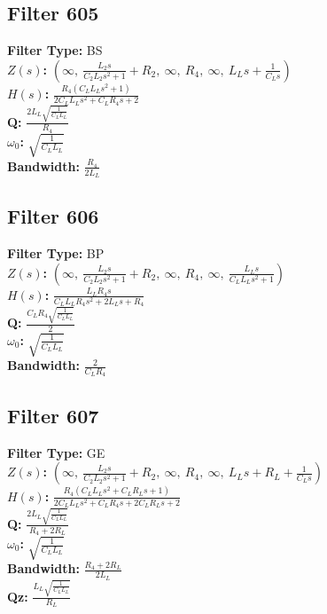 \documentclass{article}
\begin{document}
\subsection*{Filter 605}
\textbf{Filter Type:} BS \\ 
\textbf{$Z(s)$:} $\left( \infty, \  \frac{L_{2} s}{C_{2} L_{2} s^{2} + 1} + R_{2}, \  \infty, \  R_{4}, \  \infty, \  L_{L} s + \frac{1}{C_{L} s}\right)$ \\ 
\textbf{$H(s)$:} $\frac{R_{4} \left(C_{L} L_{L} s^{2} + 1\right)}{2 C_{L} L_{L} s^{2} + C_{L} R_{4} s + 2}$ \\ 
\textbf{Q:} $\frac{2 L_{L} \sqrt{\frac{1}{C_{L} L_{L}}}}{R_{4}}$ \\ 
\textbf{$\omega_0$:} $\sqrt{\frac{1}{C_{L} L_{L}}}$ \\ 
\textbf{Bandwidth:} $\frac{R_{4}}{2 L_{L}}$ \\ 
\subsection*{Filter 606}
\textbf{Filter Type:} BP \\ 
\textbf{$Z(s)$:} $\left( \infty, \  \frac{L_{2} s}{C_{2} L_{2} s^{2} + 1} + R_{2}, \  \infty, \  R_{4}, \  \infty, \  \frac{L_{L} s}{C_{L} L_{L} s^{2} + 1}\right)$ \\ 
\textbf{$H(s)$:} $\frac{L_{L} R_{4} s}{C_{L} L_{L} R_{4} s^{2} + 2 L_{L} s + R_{4}}$ \\ 
\textbf{Q:} $\frac{C_{L} R_{4} \sqrt{\frac{1}{C_{L} L_{L}}}}{2}$ \\ 
\textbf{$\omega_0$:} $\sqrt{\frac{1}{C_{L} L_{L}}}$ \\ 
\textbf{Bandwidth:} $\frac{2}{C_{L} R_{4}}$ \\ 
\subsection*{Filter 607}
\textbf{Filter Type:} GE \\ 
\textbf{$Z(s)$:} $\left( \infty, \  \frac{L_{2} s}{C_{2} L_{2} s^{2} + 1} + R_{2}, \  \infty, \  R_{4}, \  \infty, \  L_{L} s + R_{L} + \frac{1}{C_{L} s}\right)$ \\ 
\textbf{$H(s)$:} $\frac{R_{4} \left(C_{L} L_{L} s^{2} + C_{L} R_{L} s + 1\right)}{2 C_{L} L_{L} s^{2} + C_{L} R_{4} s + 2 C_{L} R_{L} s + 2}$ \\ 
\textbf{Q:} $\frac{2 L_{L} \sqrt{\frac{1}{C_{L} L_{L}}}}{R_{4} + 2 R_{L}}$ \\ 
\textbf{$\omega_0$:} $\sqrt{\frac{1}{C_{L} L_{L}}}$ \\ 
\textbf{Bandwidth:} $\frac{R_{4} + 2 R_{L}}{2 L_{L}}$ \\ 
\textbf{Qz:} $\frac{L_{L} \sqrt{\frac{1}{C_{L} L_{L}}}}{R_{L}}$ \\ 
\end{document}
